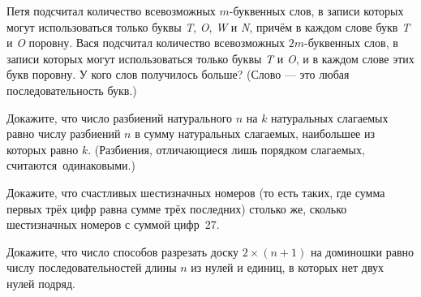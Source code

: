 \documentclass[12pt,a4paper]{article}
\begin{document}
Петя подсчитал количество всевозможных $m$-буквенных слов, в записи которых могут использоваться только буквы {\it T}, {\it O}, {\it W} и {\it N}, причём в каждом слове букв {\it T} и {\it O} поровну. Вася подсчитал количество всевозможных $2m$-буквенных слов, в записи которых могут использоваться только буквы {\it T} и {\it O}, и в каждом слове этих букв поровну. У кого слов получилось больше?
(Слово --- это любая последовательность букв.)

Докажите, что число разбиений натурального $n$
на $k$ натуральных слагаемых равно числу разбиений $n$
в сумму натуральных слагаемых, наибольшее из которых равно $k$.
(Разбиения, отличающиеся лишь порядком слагаемых,
считаются~одинаковыми.)


Докажите, что счастливых шестизначных номеров (то есть таких, где
сумма первых трёх цифр равна сумме трёх последних) столько же,
сколько шестизначных номеров с суммой цифр~27.


Докажите, что число способов разрезать доску $2\times (n+1)$ на доминошки равно числу последовательностей длины $n$ из нулей и единиц, в которых нет двух нулей подряд.

\end{document}
